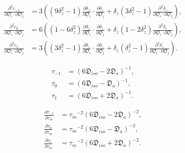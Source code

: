 \documentclass[a4paper,11pt,twoside,openright]{book}
\def\lthtmlcheckvsize{\ifdim\ht\sizebox<\vsize 
  \ifdim\wd\sizebox<\hsize\expandafter\hfill\fi \expandafter\vfill
  \else\expandafter\vss\fi}%
\begin{document}
{\newpage\clearpage
\setcounter{equation}{152}
%
\begin{subequations}\begin{align}
\frac{\partial^2 c_{-1}}{\partial \mathfrak{O}_i \cdot \partial \mathfrak{O}_j}  &=  3 \left(
(9\delta_z^2 - 1) \frac{\partial \delta_z}{\partial \mathfrak{O}_i} \cdot \frac{\partial \delta_z}{\partial \mathfrak{O}_j}
+  \delta_z (3\delta_z^2 - 1) \frac{\partial^2 \delta_z}{\partial \mathfrak{O}_i \cdot \partial \mathfrak{O}_j} \right), \\
\frac{\partial^2 c_{0}}{\partial \mathfrak{O}_i \cdot \partial \mathfrak{O}_j}  &=  6 \left(
(1 - 6\delta_z^2) \frac{\partial \delta_z}{\partial \mathfrak{O}_i} \cdot \frac{\partial \delta_z}{\partial \mathfrak{O}_j}
+  \delta_z (1 - 2\delta_z^2) \frac{\partial^2 \delta_z}{\partial \mathfrak{O}_i \cdot \partial \mathfrak{O}_j} \right), \\
\frac{\partial^2 c_{1}}{\partial \mathfrak{O}_i \cdot \partial \mathfrak{O}_j}  &=  3 \left(
(3\delta_z^2 - 1) \frac{\partial \delta_z}{\partial \mathfrak{O}_i} \cdot \frac{\partial \delta_z}{\partial \mathfrak{O}_j}
+  \delta_z (\delta_z^2 - 1) \frac{\partial^2 \delta_z}{\partial \mathfrak{O}_i \cdot \partial \mathfrak{O}_j} \right).
\end{align}\end{subequations}%
\lthtmldisplayZ
\lthtmlcheckvsize\clearpage}

{\newpage\clearpage
\setcounter{equation}{153}
%
\begin{subequations}\begin{align}
\tau_{-1} &= (6\mathfrak{D}_{iso} - 2\mathfrak{D}_a)^{-1}, \\
\tau_{0}  &= (6\mathfrak{D}_{iso} - \mathfrak{D}_a)^{-1}, \\
\tau_{1}  &= (6\mathfrak{D}_{iso} + 2\mathfrak{D}_a)^{-1}.
\end{align}\end{subequations}%
\lthtmldisplayZ
\lthtmlcheckvsize\clearpage}

{\newpage\clearpage
\setcounter{equation}{154}
%
\begin{subequations}\begin{align}
\frac{\partial \tau_{-1}}{\partial \tau_m} &= {\tau_m}^{-2} (6\mathfrak{D}_{iso} - 2\mathfrak{D}_a)^{-2}, \\
\frac{\partial \tau_{0}}{\partial \tau_m}  &= {\tau_m}^{-2} (6\mathfrak{D}_{iso} - \mathfrak{D}_a)^{-2}, \\
\frac{\partial \tau_{1}}{\partial \tau_m}  &= {\tau_m}^{-2} (6\mathfrak{D}_{iso} + 2\mathfrak{D}_a)^{-2}.
\end{align}\end{subequations}%
\lthtmldisplayZ
\lthtmlcheckvsize\clearpage}
\end{document}
